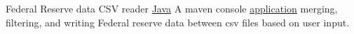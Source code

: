 {Federal Reserve data CSV reader}
{\href{https://github.com/JacobArchambault?tab=repositories\&q=\&type=\&language=java}{Java}}
{A maven console \href{https://github.com/jacobarchambault/codeloujava}{application} merging, filtering, and writing Federal reserve data between csv files based on user input.}
